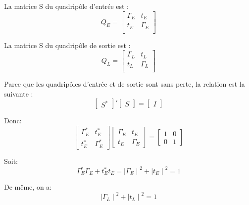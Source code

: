 \documentclass[french]{article}
\begin{document}
La matrice S du quadripôle d’entrée est :
\begin{equation}
	Q_{E} = \begin{bmatrix}
		\Gamma_{E} & t_{E}\\
		t_{E} & \Gamma_{E}\\
	\end{bmatrix}
\end{equation}

La matrice S du quadripôle de sortie est :
\begin{equation}
	Q_{L} = \begin{bmatrix}
		\Gamma_{L} & t_{L}\\
		t_{L} & \Gamma_{L}\\
	\end{bmatrix}
\end{equation}

Parce que les quadripôles d'entrée et de sortie sont sans perte, la relation est la suivante :
\begin{equation}
	{\begin{bmatrix}
		S^\ast 
	\end{bmatrix}}'
	\begin{bmatrix}
		S
	\end{bmatrix}=
	\begin{bmatrix}
		I
	\end{bmatrix}
\end{equation}

Donc:
\begin{equation}
	\begin{bmatrix}
		\Gamma_{E}^\ast & t_{E}^\ast\\
		t_{E}^\ast & \Gamma_{E}^\ast
	\end{bmatrix}
	\begin{bmatrix}
		\Gamma_{E} & t_{E}\\
		t_{E} & \Gamma_{E}
	\end{bmatrix}=
	\begin{bmatrix}
		1 & 0\\
		0 & 1
	\end{bmatrix}
\end{equation}

Soit:
\begin{equation}
	\Gamma_{E}^{\ast}\Gamma_{E}+t_{E}^{\ast}t_{E}
	={\mid \Gamma_{E}\mid}^2+{\mid t_{E}\mid}^2
	=1
	\label{eq2}
\end{equation}

De même, on a:
\begin{equation}
	{\mid \Gamma_{L}\mid}^2+{\mid t_{L}\mid}^2
	=1
	\label{eq3}
\end{equation}
\end{document}

